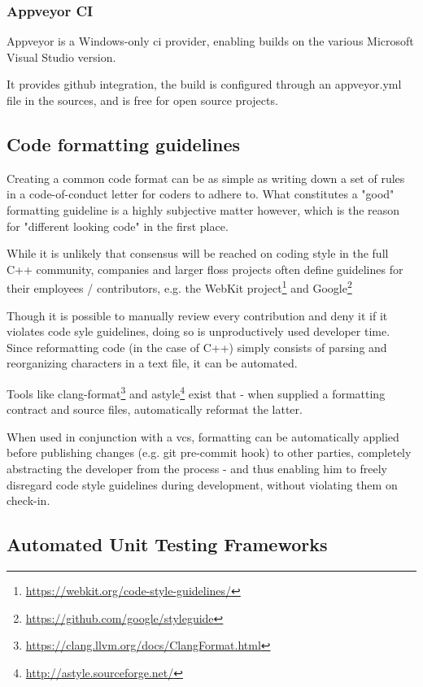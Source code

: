 \subsubsection{Appveyor CI}
Appveyor is a Windows-only \gls{ci} provider, enabling builds on the various Microsoft Visual Studio version.

It provides github integration, the build is configured through an appveyor.yml file in the sources, and is free for open source projects.

\subsection{Code formatting guidelines}
\label{sec:resformat}
Creating a common code format can be as simple as writing down a set of rules in a code-of-conduct letter for coders to adhere to. What constitutes a "good" formatting guideline is a highly subjective matter however, which is the reason for "different looking code" in the first place.

While it is unlikely that consensus will be reached on coding style in the full C++ community, companies and larger \gls{floss} projects often define guidelines for their employees / contributors,
e.g. the WebKit project\footnote{\url{https://webkit.org/code-style-guidelines/}} and Google\footnote{\url{https://github.com/google/styleguide}}

Though it is possible to manually review every contribution and deny it if it violates code syle guidelines, doing so is unproductively used developer time. Since reformatting code (in the case of C++) simply consists of parsing and reorganizing characters in a text file, it can be automated.

Tools like clang-format\footnote{\url{https://clang.llvm.org/docs/ClangFormat.html}} and astyle\footnote{\url{http://astyle.sourceforge.net/}} exist that - when supplied a formatting contract and source files, automatically reformat the latter.

When used in conjunction with a \gls{vcs}, formatting can be automatically applied before publishing changes (e.g. git pre-commit hook) to other parties, completely abstracting the developer from the process - and thus enabling him to freely disregard code style guidelines during development, without violating them on check-in.

\subsection{Automated Unit Testing Frameworks}

